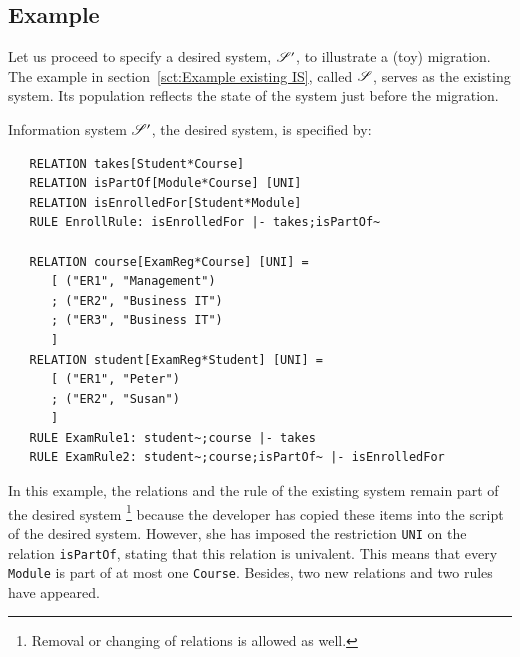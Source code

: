 \documentclass{elsarticle}
\begin{document}
\subsection{Example}
   Let us proceed to specify a desired system, $\mathscr{S}'$, to illustrate a (toy) migration.
   The example in section~\ref{sct:Example existing IS}, called $\mathscr{S}$, serves as the existing system.
   Its population reflects the state of the system just before the migration.

   Information system $\mathscr{S}'$, the desired system, is specified by:
\begin{verbatim}
   RELATION takes[Student*Course]
   RELATION isPartOf[Module*Course] [UNI]
   RELATION isEnrolledFor[Student*Module]
   RULE EnrollRule: isEnrolledFor |- takes;isPartOf~
   
   RELATION course[ExamReg*Course] [UNI] =
      [ ("ER1", "Management")
      ; ("ER2", "Business IT")
      ; ("ER3", "Business IT")
      ]
   RELATION student[ExamReg*Student] [UNI] =
      [ ("ER1", "Peter")
      ; ("ER2", "Susan")
      ]
   RULE ExamRule1: student~;course |- takes
   RULE ExamRule2: student~;course;isPartOf~ |- isEnrolledFor
\end{verbatim}
   In this example, the relations and the rule of the existing system remain part of the desired system%
\footnote{Removal or changing of relations is allowed as well.}
   because the developer has copied these items into the script of the desired system.
   However, she has imposed the restriction \verb-UNI- on the relation {\tt isPartOf}, stating that this relation is univalent.
   This means that every \verb-Module- is part of at most one \verb-Course-.
   Besides, two new relations and two rules have appeared.
\end{document}
